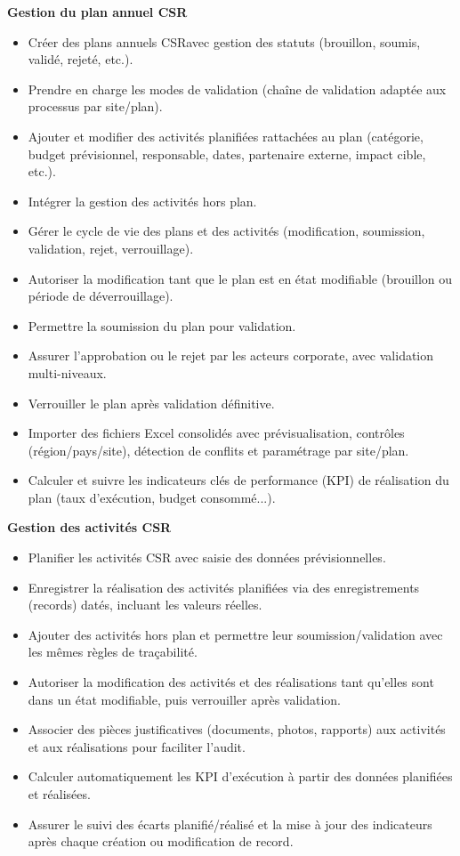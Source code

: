 \textbf{Gestion du plan annuel CSR}

\begin{itemize}[label=\textbullet, itemsep=0.15ex, parsep=0pt, topsep=0pt, partopsep=0pt]
  \item Créer des plans annuels CSRavec gestion des statuts (brouillon, soumis, validé, rejeté, etc.).
  \item Prendre en charge les modes de validation (chaîne de validation adaptée aux processus par site/plan).
  \item Ajouter et modifier des activités planifiées rattachées au plan (catégorie, budget prévisionnel, responsable, dates, partenaire externe, impact cible, etc.).
  \item Intégrer la gestion des activités hors plan.
  \item Gérer le cycle de vie des plans et des activités (modification, soumission, validation, rejet, verrouillage).
  \item Autoriser la modification tant que le plan est en état modifiable (brouillon ou période de déverrouillage).
  \item Permettre la soumission du plan pour validation.
  \item Assurer l’approbation ou le rejet par les acteurs corporate, avec validation multi-niveaux.
  \item Verrouiller le plan après validation définitive.
  \item Importer des fichiers Excel consolidés avec prévisualisation, contrôles (région/pays/site), détection de conflits et paramétrage par site/plan.
  \item Calculer et suivre les indicateurs clés de performance (KPI) de réalisation du plan (taux d’exécution, budget consommé...).
\end{itemize}

\textbf{Gestion des activités CSR}

\begin{itemize}[label=\textbullet, itemsep=0.15ex, parsep=0pt, topsep=0pt, partopsep=0pt]
  \item Planifier les activités CSR avec saisie des données prévisionnelles.
  \item Enregistrer la réalisation des activités planifiées via des enregistrements (records) datés, incluant les valeurs réelles.
  \item Ajouter des activités hors plan et permettre leur soumission/validation avec les mêmes règles de traçabilité.
  \item Autoriser la modification des activités et des réalisations tant qu’elles sont dans un état modifiable, puis verrouiller après validation.
  \item Associer des pièces justificatives (documents, photos, rapports) aux activités et aux réalisations pour faciliter l’audit.
  \item Calculer automatiquement les KPI d’exécution à partir des données planifiées et réalisées.
  \item Assurer le suivi des écarts planifié/réalisé et la mise à jour des indicateurs après chaque création ou modification de record.
\end{itemize}

